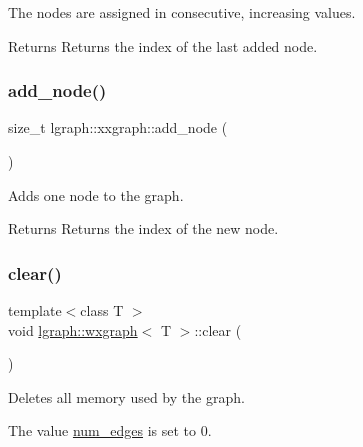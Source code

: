 The nodes are assigned in consecutive, increasing values. \begin{DoxyReturn}{Returns}
Returns the index of the last added node. 
\end{DoxyReturn}
\mbox{\label{classlgraph_1_1xxgraph_a6cb21d5e52afbb438a3e6643998c40cf}} 
\subsubsection{\texorpdfstring{add\+\_\+node()}{add\_node()}}
{\footnotesize\ttfamily size\+\_\+t lgraph\+::xxgraph\+::add\+\_\+node (\begin{DoxyParamCaption}{ }\end{DoxyParamCaption})\hspace{0.3cm}{\ttfamily [inherited]}}



Adds one node to the graph. 

\begin{DoxyReturn}{Returns}
Returns the index of the new node. 
\end{DoxyReturn}
\mbox{\label{classlgraph_1_1wxgraph_a5ce8055002673c718131a091b3f17fc0}} 
\subsubsection{\texorpdfstring{clear()}{clear()}}
{\footnotesize\ttfamily template$<$class T $>$ \\
void \hyperlink{classlgraph_1_1wxgraph}{lgraph\+::wxgraph}$<$ T $>$\+::clear (\begin{DoxyParamCaption}{ }\end{DoxyParamCaption})\hspace{0.3cm}{\ttfamily [inherited]}}



Deletes all memory used by the graph. 

The value \hyperlink{classlgraph_1_1xxgraph_a6765a9a3be42f6e0f824635c593b35d7}{num\+\_\+edges} is set to 0. \mbox{\label{classlgraph_1_1xxgraph_a4122495066e4402cbf6d2d9bb82d54cc}} 
